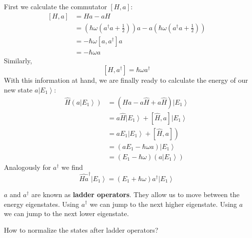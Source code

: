 \begin{mybox2}
First we calculate the commutator $[H,a]$:
$$
\begin{aligned}
[H, a] &=H a-a H \\
&=\left(\hbar \omega\left(a^{\dagger} a+\frac{1}{2}\right)\right) a-a\left(\hbar \omega\left(a^{\dagger} a+\frac{1}{2}\right)\right)\\
&=-\hbar \omega\left[a, a^{\dagger}\right] a\\
&=-\hbar \omega a
\end{aligned}
$$
Similarly,
$$
\left[H, a^{\dagger}\right]=\hbar \omega a^{\dagger}
$$
With this information at hand, we are finally ready to calculate the energy of our new state $a\left|E_{1}\right\rangle:$
$$
\begin{aligned}
\hat{H}\left(a\left|E_{1}\right\rangle\right) &=(H a-a \hat{H}+a \hat{H})\left|E_{1}\right\rangle \\
&= a \hat{H}\left|E_{1}\right\rangle+[\hat{H}, a]\left|E_{1}\right\rangle \\
&\left.=a E_{1}\left|E_{1}\right\rangle+[\hat{H}, a]\right) \\
&=\left(a E_{1}-\hbar \omega a\right)\left|E_{1}\right\rangle \\
&=\left(E_{1}-\hbar \omega\right)\left(a\left|E_{1}\right\rangle\right)
\end{aligned}
$$
Analogously for $a^{\dagger}$ we find
$$
\hat{H a}^{\dagger}\left|E_{1}\right\rangle=\left(E_{1}+\hbar \omega\right) a^{\dagger}\left|E_{1}\right\rangle
$$
\end{mybox2}
\begin{qt}
\begin{center}
     $a$ and $a^{\dagger}$ are known as \textbf{ladder operators}. They allow us to move between the energy eigenstates. Using $a^{\dagger}$ we can jump to the next higher eigenstate. Using $a$ we can jump to the next lower eigenstate.
\end{center}
\end{qt}
\begin{mybox}
\begin{center}
    How to normalize the states after ladder operators?
\end{center}
\end{mybox}
